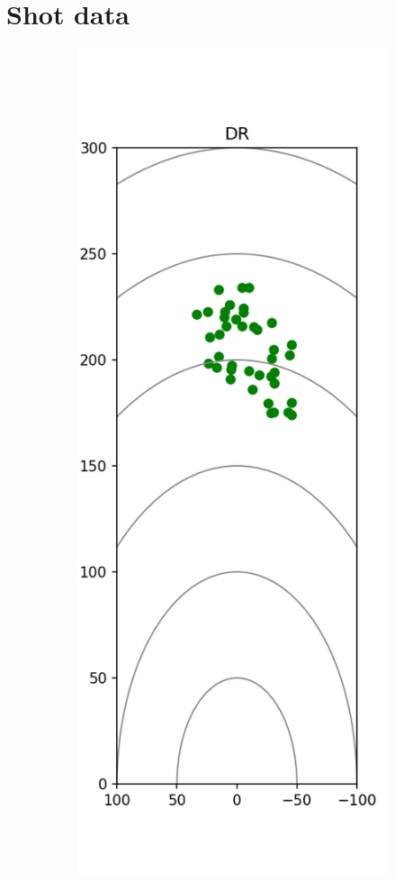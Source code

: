 \documentclass{kththesis}
\begin{document}
\chapter{Shot data}
\label{app:shot_data}
\begin{figure}
    \centering
    \begin{subfigure}{0.4\textwidth}
    \centering
    \includegraphics[height=0.4\textheight]{Shots/DR_shots.png} 

\end{subfigure}
\end{figure}
\end{document}

